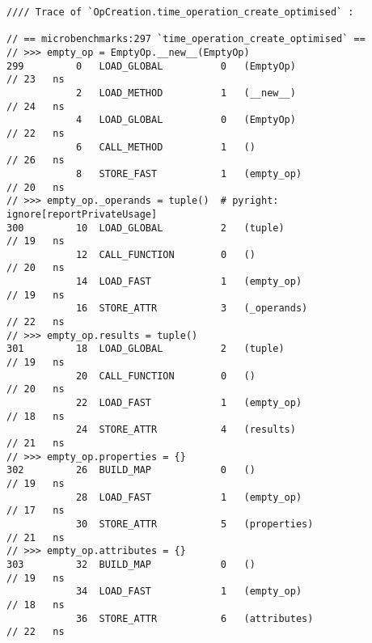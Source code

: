 \vspace{2em}
\begin{code}
    \begin{verbatim}
//// Trace of `OpCreation.time_operation_create_optimised` :

// == microbenchmarks:297 `time_operation_create_optimised` ==
// >>> empty_op = EmptyOp.__new__(EmptyOp)
299         0   LOAD_GLOBAL          0   (EmptyOp)                                                  // 23   ns
            2   LOAD_METHOD          1   (__new__)                                                  // 24   ns
            4   LOAD_GLOBAL          0   (EmptyOp)                                                  // 22   ns
            6   CALL_METHOD          1   ()                                                         // 26   ns
            8   STORE_FAST           1   (empty_op)                                                 // 20   ns
// >>> empty_op._operands = tuple()  # pyright: ignore[reportPrivateUsage]
300         10  LOAD_GLOBAL          2   (tuple)                                                    // 19   ns
            12  CALL_FUNCTION        0   ()                                                         // 20   ns
            14  LOAD_FAST            1   (empty_op)                                                 // 19   ns
            16  STORE_ATTR           3   (_operands)                                                // 22   ns
// >>> empty_op.results = tuple()
301         18  LOAD_GLOBAL          2   (tuple)                                                    // 19   ns
            20  CALL_FUNCTION        0   ()                                                         // 20   ns
            22  LOAD_FAST            1   (empty_op)                                                 // 18   ns
            24  STORE_ATTR           4   (results)                                                  // 21   ns
// >>> empty_op.properties = {}
302         26  BUILD_MAP            0   ()                                                         // 19   ns
            28  LOAD_FAST            1   (empty_op)                                                 // 17   ns
            30  STORE_ATTR           5   (properties)                                               // 21   ns
// >>> empty_op.attributes = {}
303         32  BUILD_MAP            0   ()                                                         // 19   ns
            34  LOAD_FAST            1   (empty_op)                                                 // 18   ns
            36  STORE_ATTR           6   (attributes)                                               // 22   ns

\end{verbatim}
\end{code}

